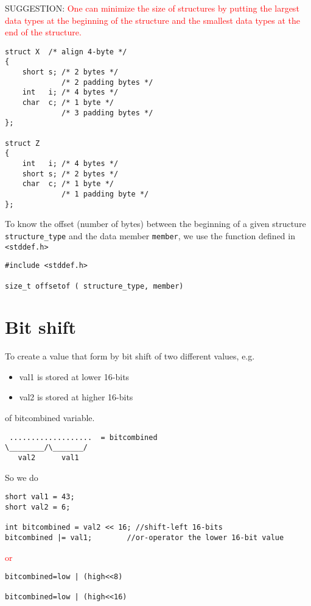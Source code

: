 SUGGESTION: \textcolor{red}{One can minimize the size of structures by putting
the largest data types at the beginning of the structure and the smallest data types
at the end of the structure.}
\begin{Verbatim}
struct X  /* align 4-byte */
{
    short s; /* 2 bytes */
             /* 2 padding bytes */
    int   i; /* 4 bytes */
    char  c; /* 1 byte */
             /* 3 padding bytes */
};

struct Z
{
    int   i; /* 4 bytes */
    short s; /* 2 bytes */
    char  c; /* 1 byte */
             /* 1 padding byte */
};
\end{Verbatim}

To know the offset (number of bytes) between the beginning of a given structure
\verb!structure_type! and the data member \verb!member!, we use the function
defined in \verb!<stddef.h>!
\begin{verbatim}
#include <stddef.h>

size_t offsetof ( structure_type, member)
\end{verbatim}

\section{Bit shift}
\label{sec:bit-shift}


To create a value that form by bit shift of two different values, e.g.
\begin{itemize}
  \item val1 is stored at lower 16-bits
  \item val2 is stored at higher 16-bits 
\end{itemize}
of bitcombined variable.
\begin{verbatim}
 ...................  = bitcombined
\________/\_______/
   val2      val1
\end{verbatim}
So we do

\begin{lstlisting}
short val1 = 43;
short val2 = 6;

int bitcombined = val2 << 16; //shift-left 16-bits
bitcombined |= val1;        //or-operator the lower 16-bit value
\end{lstlisting}
\textcolor{red}{or}
\begin{verbatim}
bitcombined=low | (high<<8)

bitcombined=low | (high<<16)

\end{verbatim}


